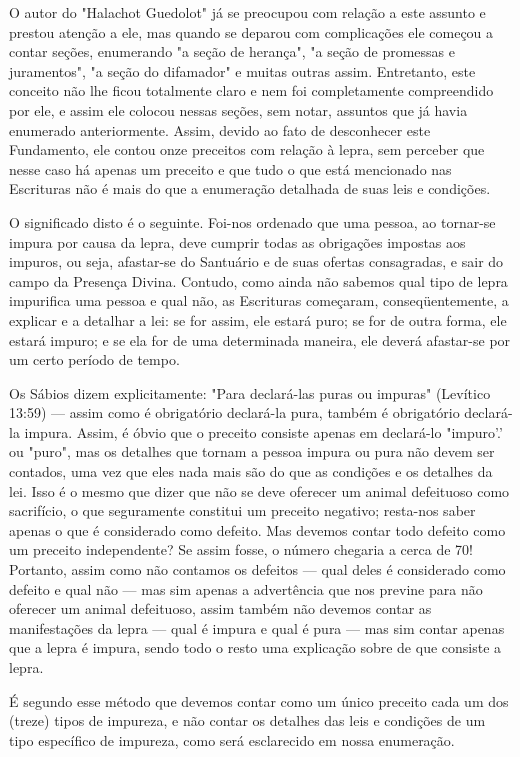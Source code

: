\begin{itemize}
\begin{enumrate}
O autor do "Halachot Guedolot" já se preocupou com relação a es­te
assunto e prestou atenção a ele, mas quando se deparou com complicações
ele começou a contar seções, enumerando "a seção de herança", "a seção
de promessas e juramentos", "a seção do difamador" e muitas outras
assim. En­tretanto, este conceito não lhe ficou totalmente claro e nem
foi completamen­te compreendido por ele, e assim ele colocou nessas
seções, sem notar, assun­tos que já havia enumerado anteriormente.
Assim, devido ao fato de desconhe­cer este Fundamento, ele contou onze
preceitos com relação à lepra, sem per­ceber que nesse caso há apenas um
preceito e que tudo o que está mencionado nas Escrituras não é mais do
que a enumeração detalhada de suas leis e condições.

O significado disto é o seguinte. Foi-nos ordenado que uma pessoa, ao
tornar-se impura por causa da lepra, deve cumprir todas as obrigações
im­postas aos impuros, ou seja, afastar-se do Santuário e de suas
ofertas consagra­das, e sair do campo da Presença Divina. Contudo, como
ainda não sabemos qual tipo de lepra impurifica uma pessoa e qual não,
as Escrituras começaram, conseqüentemente, a explicar e a detalhar a
lei: se for assim, ele estará puro; se for de outra forma, ele estará
impuro; e se ela for de uma determinada ma­neira, ele deverá afastar-se
por um certo período de tempo.

Os Sábios dizem explicitamente: "Para declará-las puras ou impuras"
(Levítico 13:59) --- assim como é obrigatório declará-la pura, também é
obriga­tório declará-la impura. Assim, é óbvio que o preceito consiste
apenas em declará-lo "impuro'.' ou "puro", mas os detalhes que tornam a
pessoa impura ou pura não devem ser contados, uma vez que eles nada mais
são do que as condições e os detalhes da lei. Isso é o mesmo que dizer
que não se deve ofere­cer um animal defeituoso como sacrifício, o que
seguramente constitui um pre­ceito negativo; resta-nos saber apenas o
que é considerado como defeito. Mas devemos contar todo defeito como um
preceito independente? Se assim fosse, o número chegaria a cerca de 70!
Portanto, assim como não contamos os defei­tos --- qual deles é
considerado como defeito e qual não --- mas sim apenas a advertência que
nos previne para não oferecer um animal defeituoso, assim tam­bém não
devemos contar as manifestações da lepra --- qual é impura e qual é pura
--- mas sim contar apenas que a lepra é impura, sendo todo o resto uma
explicação sobre de que consiste a lepra.

É segundo esse método que devemos contar como um único pre­ceito cada um
dos (treze) tipos de impureza, e não contar os detalhes das leis e
condições de um tipo específico de impureza, como será esclarecido em
nos­sa enumeração.


\end{enumrate}
\end{itemize}
